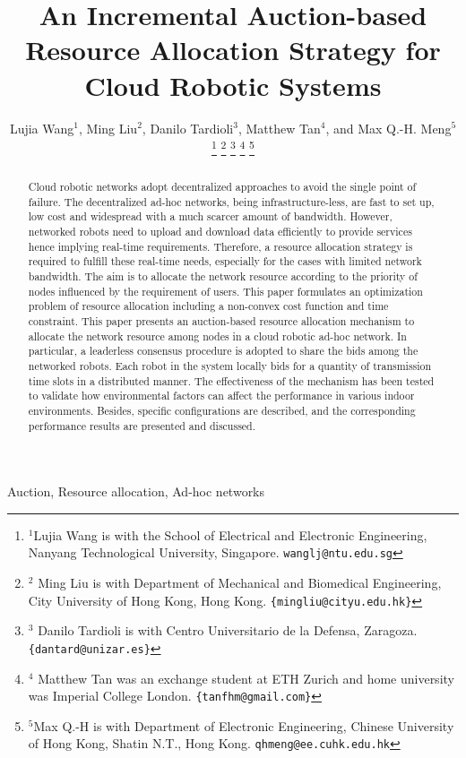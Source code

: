 \documentclass[journal]{IEEEtran}  %
\title{An Incremental Auction-based Resource Allocation Strategy for Cloud
  Robotic Systems 
}
\author{Lujia Wang$^{1}$, Ming Liu$^{2}$, Danilo
  Tardioli$^{3}$, Matthew Tan$^{4}$,  and Max Q.-H. Meng$^{5}$ %

\thanks{$^{1}$Lujia Wang is with the School of Electrical and Electronic
  Engineering, Nanyang Technological University, Singapore. 
          {\tt  \small wanglj@ntu.edu.sg}}           %
  \thanks{$^2$  
  Ming Liu  is with
  Department of Mechanical and Biomedical Engineering,
  City University of Hong Kong, Hong Kong. 
  \tt \small \{mingliu@cityu.edu.hk\}}           %
  \thanks{$^3$ Danilo Tardioli is with
   Centro Universitario de la Defensa, Zaragoza. 
  \tt \small \{dantard@unizar.es\}}           %
  \thanks{$^{4}$
  Matthew Tan was an exchange student at ETH Zurich and home university was
    Imperial College London.  \tt \small \{tanfhm@gmail.com\}}           %
\thanks{$^{5}$Max Q.-H is with Department of Electronic Engineering, Chinese
  University of Hong Kong, Shatin N.T., Hong Kong. 
          {\tt  \small qhmeng@ee.cuhk.edu.hk}}           %
}
\begin{document}
\linenumbers 

\maketitle

\begin{abstract}
Cloud robotic networks adopt decentralized approaches to avoid the
single point of failure.
The decentralized ad-hoc networks, being infrastructure-less, are fast to set
up, low cost and widespread with a much scarcer amount of bandwidth.
However, networked robots need to upload and download data efficiently to
provide services  hence implying real-time requirements. 
Therefore, a resource allocation strategy is required to fulfill these
real-time needs, especially for the cases with limited network bandwidth.
The aim is 
to allocate the network resource according to the priority of nodes influenced
by the requirement of users. 
This paper formulates an optimization problem of resource allocation including
a non-convex cost function and time constraint. 
This paper presents an auction-based resource allocation mechanism to allocate
the network resource among nodes in a cloud robotic ad-hoc network.
In particular, a leaderless consensus procedure is adopted to share the bids
among the networked robots. 
Each robot in the system locally bids for a quantity of transmission time slots
in a distributed manner.
The effectiveness of the mechanism has been tested to validate how
environmental factors can affect the performance in various indoor
environments. 
Besides, specific configurations are described, and the corresponding
performance results are presented and discussed.
\end{abstract}

\begin{keywords}
Auction, Resource allocation, Ad-hoc networks
\end{keywords}
\end{document}
